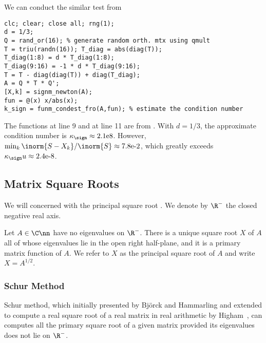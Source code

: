 We can conduct the similar test from 
\begin{lstlisting}
clc; clear; close all; rng(1);
d = 1/3;
Q = rand_or(16); % generate random orth. mtx using qmult
T = triu(randn(16)); T_diag = abs(diag(T));
T_diag(1:8) = d * T_diag(1:8); 
T_diag(9:16) = -1 * d * T_diag(9:16);
T = T - diag(diag(T)) + diag(T_diag);
A = Q * T * Q';
[X,k] = signm_newton(A);
fun = @(x) x/abs(x); 
k_sign = funm_condest_fro(A,fun); % estimate the condition number
\end{lstlisting}
The functions  at line 9 and 
at line 11 are from \cite{high-mft}. With $d = 1/3$, the approximate
condition number is $\kappa_{\sign} \approx \text{2.1e8}$. However,
$\min_{k}\inorm{S - X_{k}}/\inorm{S} \approx \text{7.8e-2}$, which greatly
exceeds $\kappa_{\sign}u \approx \text{2.4e-8}$.

\subsection{Matrix Square Roots}
\label{sec.matrix-square-roots}

We will concerned with the principal square root . We denote by $\R^{-}$ the closed negative real axis.

\begin{theorem}
\label{thm.principal-sqrt}
Let $A\in\C\nn$ have no eigenvalues on $\R^{-}$. There is a unique square
root $X$ of $A$ all of whose eigenvalues lie in the open right half-plane,
and it is a primary matrix function of $A$. We refer to $X$ as the
principal square root of $A$ and write $X = A^{1/2}$.
\end{theorem}


\subsubsection{Schur Method}
\label{sec.schur-method}
Schur method, which initially presented by Bj\"{o}rck and Hammarling
 and extended to compute a real square root of a real
matrix in real arithmetic by Higham~, can
computes all the primary square root of a given matrix provided its
eigenvalues does not lie on $\R^{-}$.

